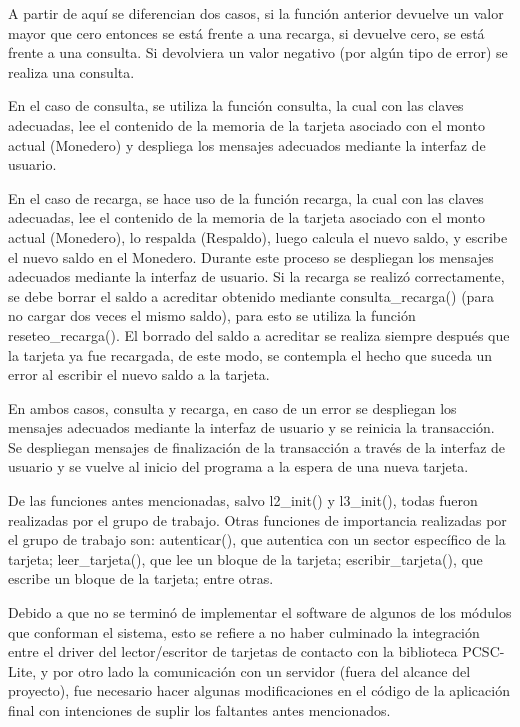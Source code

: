 A partir de aquí se diferencian dos casos, si la función anterior devuelve un valor mayor que cero entonces se está frente a una recarga, si devuelve cero, se está frente a una consulta. Si devolviera un valor negativo (por algún tipo de error) se realiza una consulta.

En el caso de consulta, se utiliza la función consulta, la cual con las claves adecuadas, lee el contenido de la memoria de la tarjeta asociado con el monto actual (Monedero) y despliega los mensajes adecuados mediante la interfaz de usuario.

En el caso de recarga, se hace uso de la función recarga, la cual con las claves adecuadas, lee el contenido de la memoria de la tarjeta asociado con el monto actual (Monedero), lo respalda (Respaldo), luego calcula el nuevo saldo, y escribe el nuevo saldo en el Monedero. Durante este proceso se despliegan los mensajes adecuados mediante la interfaz de usuario. Si la recarga se realizó correctamente, se debe borrar el saldo a acreditar obtenido mediante consulta\_recarga() (para no cargar dos veces el mismo saldo), para esto se utiliza la función reseteo\_recarga(). El borrado del saldo a acreditar se realiza siempre después que la tarjeta ya fue recargada, de este modo, se contempla el hecho que suceda un error al escribir el nuevo saldo a la tarjeta.

En ambos casos, consulta y recarga, en caso de un error se despliegan los mensajes adecuados mediante la interfaz de usuario y se reinicia la transacción.
Se despliegan mensajes de finalización de la transacción a través de la interfaz de usuario y se vuelve al inicio del programa a la espera de una nueva tarjeta.

\bigskip
De las funciones antes mencionadas, salvo l2\_init() y l3\_init(), todas fueron realizadas por el grupo de trabajo. Otras funciones de importancia realizadas por el grupo de trabajo son: autenticar(), que autentica con un sector específico de la tarjeta; leer\_tarjeta(), que lee un bloque de la tarjeta; escribir\_tarjeta(), que escribe un bloque de la tarjeta; entre otras.

\bigskip
{}

Debido a que no se terminó de implementar el software de algunos de los módulos que conforman el sistema, esto se refiere a no haber culminado la integración entre el driver del lector/escritor de tarjetas de contacto con la biblioteca PCSC-Lite, y por otro lado la comunicación con un servidor (fuera del alcance del proyecto), fue necesario hacer algunas modificaciones en el código de la aplicación final con intenciones de suplir los faltantes antes mencionados.

